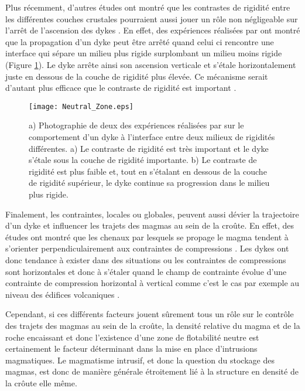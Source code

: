 Plus  récemment, d'autres  études  ont montré  que  les contrastes  de
rigidité  entre les  différentes  couches  crustales pourraient  aussi
jouer un  rôle non  négligeable sur l'arrêt  de l'ascension  des dykes
\citep{Menand:2011ki}.   En  effet,   des  expériences  réalisées  par
\citet{Kavanagh:2006ig} ont  montré que la propagation  d'un dyke peut
être  arrêté quand  celui ci  rencontre  une interface  qui sépare  un
milieu  plus  rigide  surplombant   un  milieu  moins  rigide  (Figure
\ref{Neutral_Zone}). Le  dyke arrête ainsi son  ascension verticale et
s'étale horizontalement juste en dessous de la couche de rigidité plus
élevée. Ce mécanisme serait d'autant plus efficace que le contraste de
rigidité est important \citep{Kavanagh:2006ig}.

\begin{figure}[htpb]
  \begin{center}
    \graphicspath{ {/Users/thorey/Documents/These/Manuscript/Figure/Chapter1/} }
    \texttt{[image: Neutral\_Zone.eps]}
    \caption{a)  Photographie de  deux des  expériences réalisées  par
      \citet{Kavanagh:2006ig}   sur  le   comportement  d'un   dyke  à
      l'interface entre  deux milieux de rigidités  différentes. a) Le
      contraste de rigidité est très important et le dyke s'étale sous
      la couche de  rigidité importante.  b) Le  contraste de rigidité
      est plus faible et, tout en s'étalant en dessous de la couche de
      rigidité  supérieur, le  dyke  continue sa  progression dans  le
      milieu plus rigide.}
    \label{Neutral_Zone}
  \end{center}
\end{figure}


Finalement, les contraintes, locales ou globales, peuvent aussi dévier
la trajectoire d'un dyke et influencer  les trajets des magmas au sein
de la  croûte.  En effet,  des études ont  montré que les  chenaux par
lesquels se propage le  magma tendent à s'orienter perpendiculairement
aux contraintes de  compressions \citep{Anderson:L5JA3dNN}.  Les dykes
ont donc tendance à exister dans  des situations ou les contraintes de
compressions sont  horizontales et donc  à s'étaler quand le  champ de
contrainte  évolue  d'une  contrainte   de  compression  horizontal  à
vertical  comme  c'est le  cas  par  exemple  au niveau  des  édifices
volcaniques \citep{Pinel:2000wa,Pinel:2004ji,Roman:2014hw}.

Cependant, si ces différents facteurs jouent sûrement tous un rôle sur
le contrôle  des trajets des magmas  au sein de la  croûte, la densité
relative du magma et de la  roche encaissant et donc l'existence d'une
zone  de flotabilité  neutre est  certainement le  facteur déterminant
dans  la  mise  en  place  d'intrusions  magmatiques.   Le  magmatisme
intrusif, et  donc la  question du  stockage des  magmas, est  donc de
manière  générale étroitement  lié à  la  structure en  densité de  la
crôute elle même.


